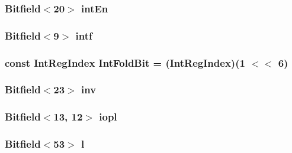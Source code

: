 \label{namespaceX86ISA_ad4c44000b725a32955ce5a71dd748d6c}
\hypertarget{namespaceX86ISA_ada656cc8cdd9d4693b9f6d9df3d700d5}{
\subsubsection[{intEn}]{\setlength{\rightskip}{0pt plus 5cm}Bitfield$<$20$>$ {\bf intEn}}}
\label{namespaceX86ISA_ada656cc8cdd9d4693b9f6d9df3d700d5}
\hypertarget{namespaceX86ISA_a69939af9f719ff9a09fe8b608811dd36}{
\subsubsection[{intf}]{\setlength{\rightskip}{0pt plus 5cm}Bitfield$<$9$>$ {\bf intf}}}
\label{namespaceX86ISA_a69939af9f719ff9a09fe8b608811dd36}
\hypertarget{namespaceX86ISA_a839d36f6b65e52c16579f4cdb5165f15}{
\subsubsection[{IntFoldBit}]{\setlength{\rightskip}{0pt plus 5cm}const IntRegIndex {\bf IntFoldBit} = (IntRegIndex)(1 $<$$<$ 6)}}
\label{namespaceX86ISA_a839d36f6b65e52c16579f4cdb5165f15}
\hypertarget{namespaceX86ISA_a0e14d22f7f133424918828db9795c13e}{
\subsubsection[{inv}]{\setlength{\rightskip}{0pt plus 5cm}Bitfield$<$23$>$ {\bf inv}}}
\label{namespaceX86ISA_a0e14d22f7f133424918828db9795c13e}
\hypertarget{namespaceX86ISA_ac966a885659ad395dbe7fd870c96544b}{
\subsubsection[{iopl}]{\setlength{\rightskip}{0pt plus 5cm}Bitfield$<$13, 12$>$ {\bf iopl}}}
\label{namespaceX86ISA_ac966a885659ad395dbe7fd870c96544b}
\hypertarget{namespaceX86ISA_a440d5dd6001d28c631dac4b038a14fce}{
\subsubsection[{l}]{\setlength{\rightskip}{0pt plus 5cm}Bitfield$<$53$>$ {\bf l}}}
